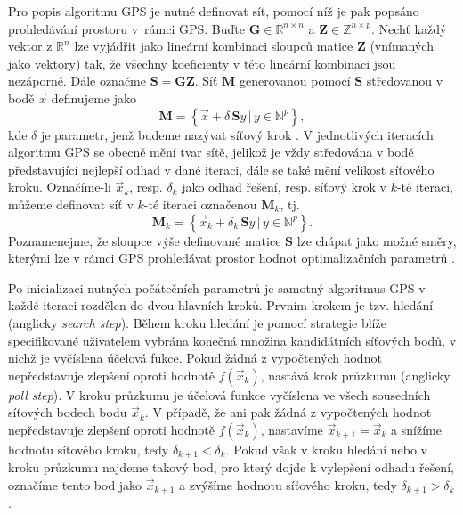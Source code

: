Pro popis algoritmu GPS je nutné definovat síť, pomocí níž je pak popsáno prohledávání prostoru v~rámci GPS. Buďte $ \mathbf{G} \in \mathbb{R}^{n \times n} $ a $ \mathbf{Z} \in \mathbb{Z}^{n \times p} $. Nechť  každý vektor z $ \mathbb{R}^{n} $ lze vyjádřit jako lineární kombinaci sloupců matice $ \mathbf{Z} $ (vnímaných jako vektory) tak, že všechny koeficienty v této lineární kombinaci jsou nezáporné. Dále označme $ \mathbf{S} = \mathbf{G} \mathbf{Z}$. Síť $ \mathbf{M} $ generovanou pomocí $ \mathbf{S} $ středovanou v bodě $ \vec{x} $ definujeme jako
\begin{equation}
	\mathbf{M} = \left\{ \vec{x} + \delta \, \mathbf{S} y \, | \, y \in \mathbb{N}^p \right\},
\end{equation}
kde $ \delta $ je parametr, jenž budeme nazývat síťový krok \cite{BBO-textbook, Audet2002}. V jednotlivých iteracích algoritmu GPS se obecně mění tvar sítě, jelikož je vždy středována v bodě představující nejlepší odhad v dané iteraci, dále se také mění velikost síťového kroku. Označíme-li $ \vec{x}_k $, resp. $ \delta_k $ jako odhad řešení, resp. síťový krok  v $ k $-té iteraci, můžeme definovat síť v $ k $-té iteraci označenou $ \mathbf{M} _k$, tj.
\begin{equation}
\mathbf{M} _k = \left\{ \vec{x}_k + \delta_k \, \mathbf{S} y \, | \, y \in \mathbb{N}^p \right\}.
\end{equation}
Poznamenejme, že sloupce výše definované matice $ \mathbf{S} $ lze chápat jako možné směry, kterými lze v rámci GPS prohledávat prostor hodnot optimalizačních parametrů \cite{BBO-textbook, Audet2002}.

Po inicializaci nutných počátečních parametrů je samotný algoritmus GPS v každé iteraci rozdělen do dvou hlavních kroků. Prvním krokem je tzv. hledání (anglicky \textit{search step}). Během kroku hledání je pomocí strategie blíže specifikované uživatelem vybrána konečná množina kandidátních síťových bodů, v nichž je vyčíslena účelová fukce. Pokud žádná z vypočtených hodnot nepředstavuje zlepšení oproti hodnotě $ f(\vec{x}_k) $, nastává krok průzkumu (anglicky \textit{poll step}). V kroku průzkumu je účelová funkce vyčíslena ve všech sousedních síťových bodech bodu $ \vec{x}_k $. V případě, že ani pak žádná z vypočtených hodnot nepředstavuje zlepšení oproti hodnotě $ f(\vec{x}_k) $, nastavíme $ \vec{x}_{k+1} = \vec{x}_k $ a snížíme hodnotu síťového kroku, tedy  $ \delta_{k+1} < \delta_k $. Pokud však v kroku hledání nebo v kroku průzkumu najdeme takový bod, pro který dojde k vylepšení odhadu řešení, označíme tento bod jako $ \vec{x}_{k+1} $ a zvýšíme hodnotu síťového kroku, tedy  $ \delta_{k+1} > \delta_k $ \cite{BBO-textbook, Audet2002}.

